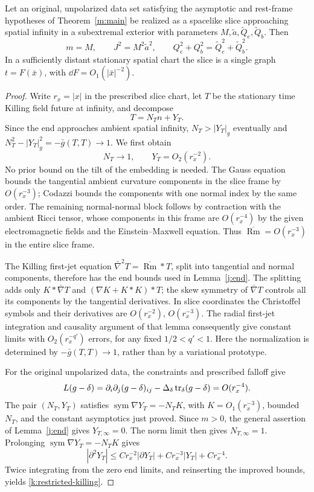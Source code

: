 \begin{lemma}\label{k:end-identification}
Let an original, unpolarized data set satisfying the asymptotic
and rest-frame hypotheses of Theorem~\ref{m:main} be realized
as a spacelike slice approaching spatial infinity in a
subextremal \KN{} exterior with parameters
\(M,\widetilde a,\widetilde Q_e,\widetilde Q_b\). Then
\[
 m=M,\qquad J^2=M^2\widetilde a^2,\qquad
 Q_e^2+Q_b^2=\widetilde Q_e^2+\widetilde Q_b^2 .
\]
In a sufficiently distant stationary spatial chart the slice
is a single graph \(t=F(\bar x)\), with
\(\dd F=O_1(|\bar x|^{-2})\).
\end{lemma}

\begin{proof}
Write \(r_x=|x|\) in the prescribed slice chart, let \(T\) be
the stationary time Killing field future at infinity, and
decompose
\[
 T=N_Tn+Y_T .
\]
Since the end approaches ambient spatial infinity,
\(N_T>|Y_T|_g\) eventually and
\(N_T^2-|Y_T|_g^2=-\bar g(T,T)\to1\).
We first obtain
\begin{equation}\label{k:restricted-killing}
 N_T\to1,\qquad Y_T=O_2(r_x^{-2}).
\end{equation}
No prior bound on the tilt of the embedding is needed.
The Gauss equation bounds the tangential ambient curvature
components in the slice frame by \(O(r_x^{-3})\); Codazzi
bounds the components with one normal index by the same order.
The remaining normal-normal block follows by contraction
with the ambient Ricci tensor, whose components in this
frame are \(O(r_x^{-4})\) by the given electromagnetic fields
and the Einstein--Maxwell equation. Thus
\(\overline{\operatorname{Rm}}=O(r_x^{-3})\) in the entire
slice frame.

The Killing first-jet equation
\(\bar\nabla^2T=\overline{\operatorname{Rm}}*T\), split into
tangential and normal components, therefore has the end
bounds used in Lemma~\ref{j:end}. The splitting adds only
\(K*\bar\nabla T\) and
\((\nabla K+K*K)*T\); the skew symmetry of \(\bar\nabla T\)
controls all its components by the tangential derivatives.
In slice coordinates the Christoffel symbols and their
derivatives are \(O(r_x^{-2})\), \(O(r_x^{-3})\).
The radial first-jet integration and causality argument of
that lemma consequently give constant limits with
\(O_2(r_x^{-q'})\) errors, for any fixed \(1/2<q'<1\).
Here the normalization is determined by
\(-\bar g(T,T)\to1\), rather than by a variational prototype.

For the original unpolarized data, the constraints and prescribed falloff give
\[
 L(g-\delta)=\partial_i\partial_j(g-\delta)_{ij}
       -\Delta_\delta\operatorname{tr}_\delta(g-\delta)=O(r_x^{-4}).
\]
The pair \((N_T,Y_T)\) satisfies
\(\operatorname{sym}\nabla Y_T=-N_TK\), with \(K=O_1(r_x^{-3})\),
bounded \(N_T\), and the constant asymptotics just proved. Since \(m>0\),
the general assertion of Lemma~\ref{j:end} gives \(Y_{T,\infty}=0\).
The norm limit then gives \(N_{T,\infty}=1\).
Prolonging \(\operatorname{sym}\nabla Y_T=-N_TK\) gives
\[
 |\partial^2Y_T|
 \le C r_x^{-2}|\partial Y_T|
       +Cr_x^{-3}|Y_T|+Cr_x^{-4}.
\]
Twice integrating from the zero end limits, and reinserting
the improved bounds, yields \eqref{k:restricted-killing}.


\end{proof}
